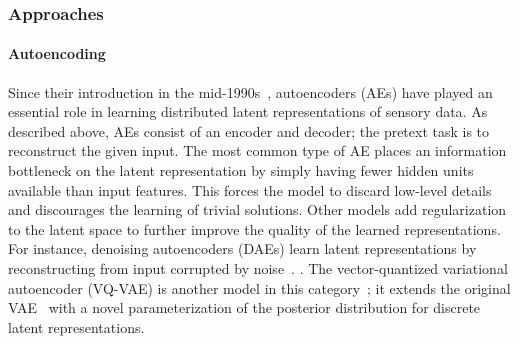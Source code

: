 \subsubsection{Approaches}

\paragraph{Autoencoding} 
Since their introduction in the mid-1990s~\parencite{hinton_autoencoders_1994}, autoencoders (AEs)
have played an essential role in learning distributed latent representations of
sensory data. 
As described above, AEs consist of an encoder and decoder; the pretext task
is to reconstruct the given input. The most common type of AE places an
information bottleneck on the latent representation by simply having fewer
hidden units available than input features. This forces the model to discard
low-level details and discourages the learning of trivial solutions. Other models add
regularization to the latent space to further improve the quality of the
learned representations.
For instance, denoising autoencoders (DAEs) learn latent representations by
reconstructing from input corrupted by noise~\parencite{vincent_stacked_2010}. 
.
The vector-quantized variational autoencoder (VQ-VAE) is another model in this
category~\parencite{oord_neural_2018};
it extends the original VAE~\parencite{kingma_autoencoding_2014} with a novel
parameterization of the posterior distribution for discrete latent
representations. 



